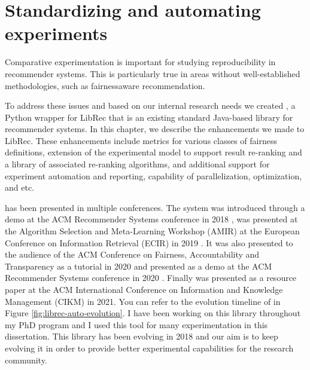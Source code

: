 
\chapter{Standardizing and automating experiments}
\label{librec-auto}


Comparative experimentation is important for studying reproducibility in recommender systems. This is particularly true in areas without well-established methodologies, such as fairnessaware recommendation. 

To address these issues and based on our internal research needs we created \libauto{}, a Python wrapper for LibRec that is an existing standard Java-based library for recommender systems. In this chapter, we describe the enhancements we made to LibRec. These enhancements include metrics for various classes of fairness definitions, extension of the experimental model to support result re-ranking and a library of associated re-ranking algorithms, and additional support for experiment automation and reporting, capability of parallelization, optimization, and etc.


\libauto{} has been presented in multiple conferences. The system was introduced through a demo at the ACM Recommender Systems conference in 2018 \cite{mansoury2018automating}, was presented at the Algorithm Selection and Meta-Learning Workshop (AMIR) at the European Conference on Information Retrieval (ECIR) in 2019 \cite{mansoury2019algorithm}. It was also presented to the audience of the ACM Conference on Fairness, Accountability and Transparency as a tutorial in 2020 \cite{burke2020facct_libauto} and presented as a demo at the ACM Recommender Systems conference in 2020 \cite{Sonboli2020FARLA}. Finally \libauto{} was presented as a resource paper at the ACM International Conference on Information and Knowledge Management (CIKM) in 2021. You can refer to the evolution timeline of \libauto{} in Figure \ref{fig:librec-auto-evolution}.
I have been working on this library throughout my PhD program and I used this tool for many experimentation in this dissertation. 
This library has been evolving in 2018 and our aim is to keep evolving it in order to provide better experimental capabilities for the research community.


